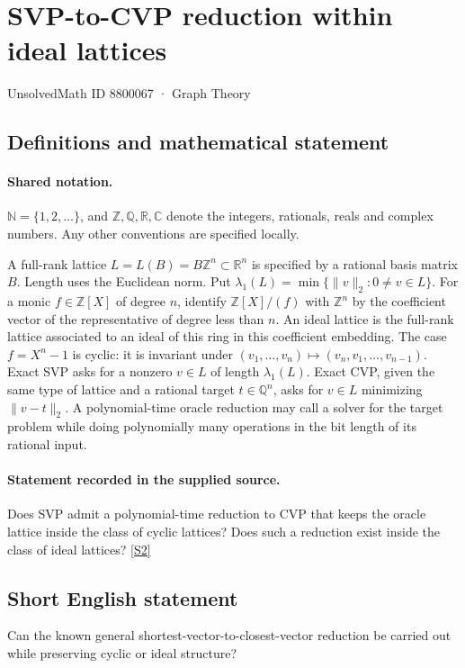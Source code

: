 \documentclass[11pt]{article}
\newcommand{\sref}[2]{\hyperlink{source:#1:#2}{[S#2]}}
\begin{document}
\setcounter{section}{8800066}
\section{SVP-to-CVP reduction within ideal lattices}\label{8800067}
{\small\sffamily UnsolvedMath ID 8800067 · Graph Theory}
\subsection{Definitions and mathematical statement}

\paragraph{Shared notation.}$\mathbb N=\{1,2,\ldots\}$, and $\mathbb Z,\mathbb Q,\mathbb R,\mathbb C$ denote the integers, rationals, reals and complex numbers. Any other conventions are specified locally.


A full-rank lattice $L=L(B)=B\mathbb Z^n\subset\mathbb R^n$ is specified by a rational basis matrix $B$. Length uses the Euclidean norm. Put $\lambda_1(L)=\min\{\|v\|_2:0\ne v\in L\}$. For a monic $f\in\mathbb Z[X]$ of degree $n$, identify $\mathbb Z[X]/(f)$ with $\mathbb Z^n$ by the coefficient vector of the representative of degree less than $n$. An ideal lattice is the full-rank lattice associated to an ideal of this ring in this coefficient embedding. The case $f=X^n-1$ is cyclic: it is invariant under $(v_1,\ldots,v_n)\mapsto(v_n,v_1,\ldots,v_{n-1})$. Exact SVP asks for a nonzero $v\in L$ of length $\lambda_1(L)$. Exact CVP, given the same type of lattice and a rational target $t\in\mathbb Q^n$, asks for $v\in L$ minimizing $\|v-t\|_2$. A polynomial-time oracle reduction may call a solver for the target problem while doing polynomially many operations in the bit length of its rational input.
\paragraph{Statement recorded in the supplied source.}
Does SVP admit a polynomial-time reduction to CVP that keeps the oracle lattice inside the class of cyclic lattices? Does such a reduction exist inside the class of ideal lattices? \sref{8800067}{2}

\subsection{Short English statement}
Can the known general shortest-vector-to-closest-vector reduction be carried out while preserving cyclic or ideal structure?
\end{document}
